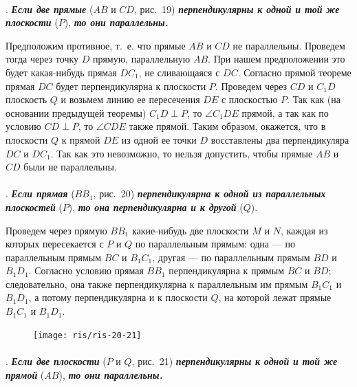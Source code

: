 \documentclass[twoside]{book}
\begin{document}
\paragraph{}\label{1938/s32}
.
\textbf{\emph{Если две прямые}} ($AB$ и $CD$, рис.~19) \textbf{\emph{перпендикулярны к одной и той же плоскости}} ($P$), \textbf{\emph{то они параллельны.}}

Предположим противное, т.~е. что прямые $AB$ и $CD$ не параллельны.
Проведем тогда через точку $D$ прямую, параллельную $AB$. %
При нашем предположении это будет какая-нибудь прямая $DC_1$, не сливающаяся с $DC$.
Согласно прямой теореме прямая $DC$ будет перпендикулярна к плоскости $P$.
Проведем через $CD$ и $C_1D$ плоскость $Q$ и возьмем линию ее пересечения $DE$ с плоскостью $P$.
Так как (на основании предыдущей теоремы) $C_1D \perp P$, то $\angle C_1DE$ прямой, а так как по условию $CD \perp P$, то $\angle CDE$ также прямой.
Таким образом, окажется, что в плоскости $Q$ к прямой $DE$ из одной ее точки $D$ восставлены два перпендикуляра $DC$ и $DC_1$.
Так как это невозможно, то нельзя допустить, чтобы прямые $AB$ и $CD$ были не параллельны.

\paragraph{}\label{1938/s33}
.
\textbf{\emph{Если прямая}} ($BB_1$, рис.~20) \textbf{\emph{перпендикулярна к одной из параллельных плоскостей}} ($P$), \textbf{\emph{то она перпендикулярна и к другой}} ($Q$).

Проведем через прямую $BB_1$ какие-нибудь две плоскости $M$ и $N$, каждая из которых пересекается с $P$ и $Q$ по параллельным прямым: одна --- по параллельным прямым $BC$ и $B_1C_1$, другая --- по параллельным прямым $BD$ и $B_1D_1$.
Согласно условию прямая $BB_1$ перпендикулярна к прямым $BC$ и $BD$;
следовательно, она также перпендикулярна к параллельным им прямым $B_1C_1$ и $B_1D_1$, а потому перпендикулярна и к плоскости $Q$, на которой лежат прямые $B_1C_1$ и $B_1D_1$.

\begin{figure}[h!]
\centering
\texttt{[image: ris/ris-20-21]}
\caption{}
\end{figure}

\paragraph{}\label{1938/s34}
.
\textbf{\emph{Если две плоскости}} ($P$ и $Q$, рис.~21) \textbf{\emph{перпендикулярны к одной и той же прямой}} ($AB$), \textbf{\emph{то они параллельны.}}
\end{document}
